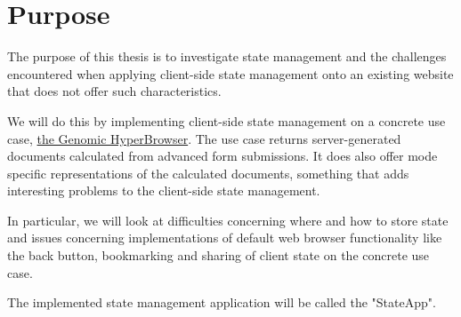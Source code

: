 \documentclass[english]{ifimaster}
\begin{document}
 

\section{Purpose}
The purpose of this thesis is to investigate state management and the challenges encountered when applying client-side state management onto an existing website that does not offer such characteristics. 

We will do this by implementing client-side state management on a concrete use case, \href{https://hyperbrowser.uio.no}{the Genomic HyperBrowser}. The use case returns server-generated documents calculated from advanced form submissions. It does also offer mode specific representations of the calculated documents, something that adds interesting problems to the client-side state management.   

In particular, we will look at difficulties concerning where and how to store state and issues concerning implementations of default web browser functionality like the back button, bookmarking and sharing of client state on the concrete use case.

The implemented state management application will be called the "StateApp".





\end{document}
